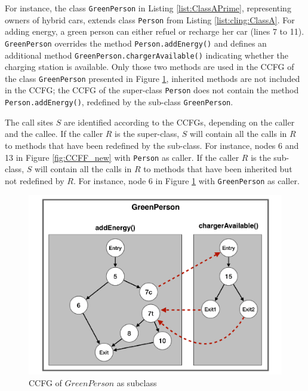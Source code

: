 For instance, the class \texttt{GreenPerson} in Listing \ref{list:ClassAPrime}, representing owners of hybrid cars, extends class \texttt{Person} from Listing \ref{list:cling:ClassA}. For adding energy, a green person can either refuel or recharge her car (lines 7 to 11). \texttt{Green\-Person} overrides the method \texttt{Person.add\-En\-er\-gy()} and defines an additional method \texttt{Green\-Person.char\-ger\-Avai\-la\-ble()} indicating whether the charging station is available. Only those two methods are used in the CCFG of the class \texttt{Green\-Person} presented in Figure \ref{fig:greenPersonCCFG}, inherited methods are not included in the CCFG; the CCFG of the super-class \texttt{Person} does not contain the method \texttt{Person.addEnergy()}, redefined by the sub-class \texttt{GreenPerson}.

The call sites $S$ are identified according to the CCFGs, depending on the caller and the callee. If the caller $R$ is the super-class, $S$ will contain all the calls in $R$ to methods that have been redefined by the sub-class. For instance, nodes 6 and 13 in Figure \ref{fig:CCFF_new} with \texttt{Person} as caller. If the caller $R$ is the sub-class, $S$ will contain all the calls in $R$ to methods that have been inherited but not redefined by $R$. For instance, node 6 in Figure \ref{fig:greenPersonCCFG} with \texttt{GreenPerson} as caller.

\begin{figure}[!t]
  \includegraphics[width=0.98\linewidth]{papers/cling/figures/GreenPerson2}
\caption{CCFG of $GreenPerson$ as subclass}
\label{fig:greenPersonCCFG}
\end{figure}
 

